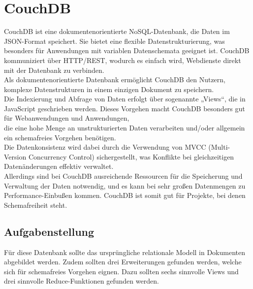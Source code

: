 
\section{CouchDB}
CouchDB ist eine dokumentenorientierte NoSQL-Datenbank, die Daten im JSON-Format speichert. Sie bietet eine flexible Datenstrukturierung, was besonders für Anwendungen mit variablen Datenschemata geeignet ist.
CouchDB kommuniziert über HTTP/REST, wodurch es einfach wird, Webdienste direkt mit der Datenbank zu verbinden.\\
Als dokumentenorientierte Datenbank ermöglicht CouchDB den Nutzern, komplexe Datenstrukturen in einem einzigen Dokument zu speichern. \\
Die Indexierung und Abfrage von Daten erfolgt über sogenannte „Views“, die in JavaScript geschrieben werden. Dieses Vorgehen macht CouchDB besonders gut für Webanwendungen und Anwendungen,\\
die eine hohe Menge an unstrukturierten Daten verarbeiten und/oder allgemein ein schemafreies Vorgehen benötigen.\\
Die Datenkonsistenz wird dabei durch die Verwendung von MVCC (Multi-Version Concurrency Control) sichergestellt, was Konflikte bei gleichzeitigen Datenänderungen effektiv verwaltet.\\
Allerdings sind bei CouchDB ausreichende Ressourcen für die Speicherung und Verwaltung der Daten notwendig, und es kann bei sehr großen Datenmengen zu Performance-Einbußen kommen.
CouchDB ist somit gut für Projekte, bei denen Schemafreiheit steht.

\subsection{Aufgabenstellung}
Für diese Datenbank sollte das ursprüngliche relationale Modell in Dokumenten abgebildet werden. Zudem sollten drei Erweiterungen gefunden werden, welche sich für schemafreies Vorgehen eignen.
Dazu sollten sechs sinnvolle Views und drei sinnvolle Reduce-Funktionen gefunden werden.

